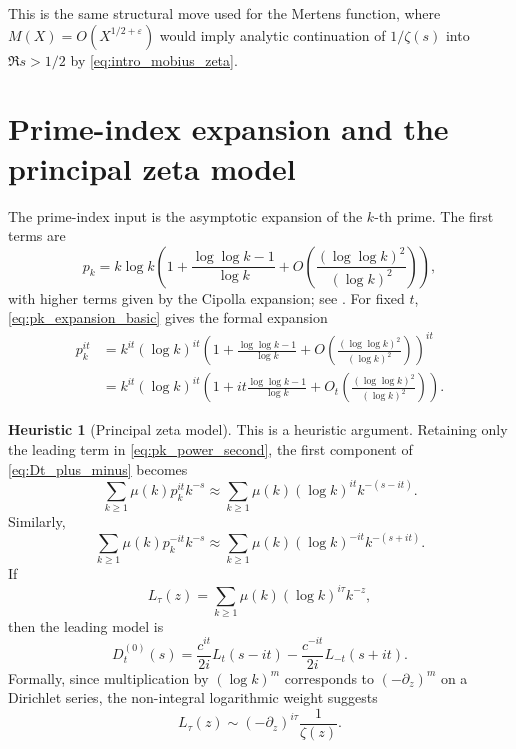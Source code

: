 \documentclass[11pt]{amsart}
\numberwithin{equation}{section}
\theoremstyle{plain}
\theoremstyle{definition}
\newtheorem{heuristic}[theorem]{Heuristic}
\theoremstyle{remark}
\begin{document}
This is the same structural move used for the Mertens function, where
$M(X)=O(X^{1/2+\varepsilon})$ would imply analytic continuation of
$1/\zeta(s)$ into $\Re s>1/2$ by \eqref{eq:intro_mobius_zeta}.

\section{Prime-index expansion and the principal zeta model}
\label{sec:prime_index_expansion}

The prime-index input is the asymptotic expansion of the $k$-th prime.
The first terms are
\begin{equation}
p_k=k\log k\left(1+\frac{\log\log k-1}{\log k}
+O\left(\frac{(\log\log k)^2}{(\log k)^2}\right)\right),
\label{eq:pk_expansion_basic}
\end{equation}
with higher terms given by the Cipolla expansion; see
\cite{Cipolla1902,AriasToulisse2013,RosserSchoenfeld1962}.
For fixed $t$, \eqref{eq:pk_expansion_basic} gives the formal expansion
\begin{align}
p_k^{it}
&=k^{it}(\log k)^{it}
\left(1+\frac{\log\log k-1}{\log k}
+O\left(\frac{(\log\log k)^2}{(\log k)^2}\right)\right)^{it}
\label{eq:pk_power_first}
\\
&=k^{it}(\log k)^{it}
\left(1+it\frac{\log\log k-1}{\log k}
+O_t\left(\frac{(\log\log k)^2}{(\log k)^2}\right)\right).
\label{eq:pk_power_second}
\end{align}

\begin{heuristic}[Principal zeta model]
\label{heur:principal_zeta_model}
This is a heuristic argument.  Retaining only the leading term in
\eqref{eq:pk_power_second}, the first component of \eqref{eq:Dt_plus_minus}
becomes
\begin{equation}
\sum_{k\ge1}\mu(k)p_k^{it}k^{-s}
\approx
\sum_{k\ge1}\mu(k)(\log k)^{it}k^{-(s-it)}.
\label{eq:leading_plus_model}
\end{equation}
Similarly,
\begin{equation}
\sum_{k\ge1}\mu(k)p_k^{-it}k^{-s}
\approx
\sum_{k\ge1}\mu(k)(\log k)^{-it}k^{-(s+it)}.
\label{eq:leading_minus_model}
\end{equation}
If
\begin{equation}
L_\tau(z)=\sum_{k\ge1}\mu(k)(\log k)^{i\tau}k^{-z},
\label{eq:Ltau_definition}
\end{equation}
then the leading model is
\begin{equation}
D_t^{(0)}(s)=\frac{c^{it}}{2i}L_t(s-it)
-\frac{c^{-it}}{2i}L_{-t}(s+it).
\label{eq:Dt0_definition}
\end{equation}
Formally, since multiplication by $(\log k)^m$ corresponds to
$(-\partial_z)^m$ on a Dirichlet series, the non-integral logarithmic
weight suggests
\begin{equation}
L_\tau(z)\sim (-\partial_z)^{i\tau}\frac1{\zeta(z)}.
\label{eq:Ltau_fractional_model}
\end{equation}
\end{heuristic}
\end{document}

